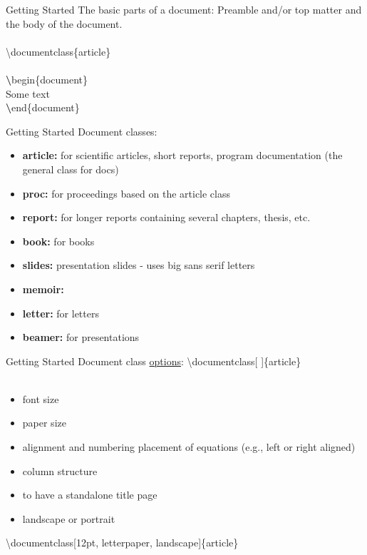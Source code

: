 \documentclass[xcolor=dvipsnames]{beamer}
\begin{document}
\begin{frame}{\LARGE{Getting Started}}
The basic parts of a document: Preamble and/or top matter and the body of the document.\\~\\
{\color{red}\textbackslash documentclass}\{{\color{OliveGreen}article}\} \\~\\

{\color{ProcessBlue}\textbf\textbackslash begin\{}{\color{blue}document}{\color{ProcessBlue}\}}\\
Some text\\
{\color{ProcessBlue}\textbf\textbackslash end\{}{\color{blue}document}{\color{ProcessBlue}\}}\\
\end{frame}

\begin{frame}{\LARGE{Getting Started}}
Document classes:
\begin{itemize}
\item \textbf{article:} for scientific articles, short reports, program documentation (the general class for docs)
\item \textbf{proc:} for proceedings based on the article class
\item \textbf{report:} for longer reports containing several chapters, thesis, etc.
\item \textbf{book:} for books
\item \textbf{slides:} presentation slides - uses big sans serif letters
\item \textbf{memoir:}
\item \textbf{letter:} for letters
\item \textbf{beamer:} for presentations
\end{itemize}

\end{frame}

\begin{frame}{\LARGE{Getting Started}}
Document class \underline{options}: {\color{red}\textbackslash documentclass}[ ]\{{\color{OliveGreen}article}\} \\~\\
\begin{itemize}
\item font size
\item paper size
\item alignment and numbering placement of equations (e.g., left or right aligned)
\item column structure
\item to have a standalone title page
\item landscape or portrait
\end{itemize}
{\color{red}\textbackslash documentclass}[12pt, letterpaper, landscape]\{{\color{OliveGreen}article}\}
\end{frame}
\end{document}
